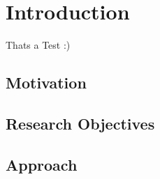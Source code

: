 \chapter{Introduction}

Thats a Test :) \cite{brieda_plasma_2019}

\section{Motivation}

\section{Research Objectives}


\section{Approach}